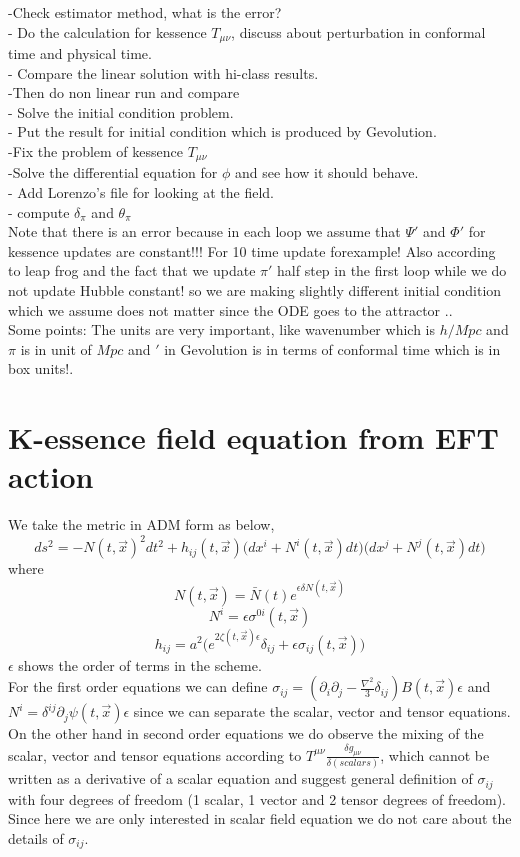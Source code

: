 \documentclass[a4paper,11pt]{article}
\def\be{\begin{equation}}
\def\ee{\end{equation}}
\begin{document}
-Check estimator method, what is the error? \\
- Do the calculation for  kessence $T_{\mu \nu}$, discuss about perturbation in conformal time and physical time. \\
- Compare the linear solution with hi-class results. \\
-Then do non linear run and compare \\
- Solve the initial condition problem. \\
- Put the result for initial condition which is produced by Gevolution. \\
-Fix the problem of kessence $T_{\mu \nu}$ \\
-Solve the differential equation for $\phi$ and see how it should behave. \\
- Add Lorenzo's file for looking at the field. \\
- compute $\delta_{\pi}$ and $\theta_{\pi}$ \\
Note that there is an error because in each loop we assume that $\Psi'$ and $\Phi'$ for kessence updates are constant!!! For 10 time update forexample!
Also according to leap frog and the fact that we update $\pi'$ half step in the first loop while we do not update Hubble constant! so we are making slightly different initial condition which we assume does not matter since the ODE goes to the attractor .. \\
Some points: The units are very important, like wavenumber which is $h/Mpc$ and $\pi$ is in unit of $Mpc$ and $'$ in Gevolution is in terms of conformal time which is in box units!. \\

 \section{K-essence field equation from EFT action}
 
 We take the metric in ADM form as below,
  \be
  ds^2= -N (t,\vec{x}) ^2 d t^2+ h_{ij } (t,\vec{x}) \Big( dx^i+N^i (t,\vec{x}) dt   \Big) \Big( dx^j+N^j (t,\vec{x}) dt   \Big)
  \ee
  where 
  \be
  N(t,\vec{x})= \bar{N} (t) e^{\epsilon \delta N (t,\vec{x})}
  \ee
  \be
  N^i=\epsilon \sigma^{0i} (t,\vec{x})
  \ee
  \be
    h_{ij}=a^2 \Big( e^{2 \zeta (t,\vec{x}) \epsilon} \delta_{ij} + \epsilon \sigma_{ij} (t,\vec{x})   \Big)
  \ee
  $\epsilon$ shows the order of terms in the scheme.\\
  For the first order equations we can define $\sigma_{ij}=(\partial_i \partial_j- \frac{\nabla^2}{3} \delta_{ij}) B(t,\vec{x}) \epsilon$ and $N^i=\delta ^{ij} \partial_j \psi (t,\vec{x}) \epsilon$  since we can separate the scalar, vector and tensor equations. \\
  On the other hand in second order equations we do observe the mixing of the scalar, vector and tensor equations according to $ T^{\mu \nu} \frac{\delta g_{\mu \nu}}{\delta (scalars)}$, which cannot be written as a derivative of a scalar equation and suggest general definition of  $\sigma_{ij}$ with four degrees of freedom (1 scalar, 1 vector and 2 tensor degrees of freedom). Since here we are only interested in  scalar field equation we do not care about the details of $\sigma_{ij}$.
\end{document}
